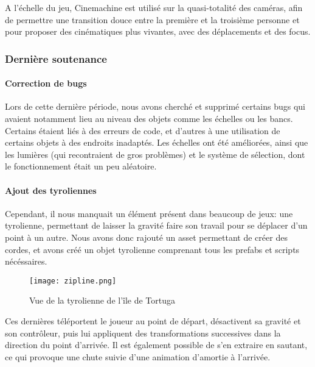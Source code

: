 			A l'échelle du jeu, Cinemachine est utilisé sur la quasi-totalité des caméras, 
			afin de permettre une transition douce entre la première et la troisième personne et pour 
			proposer des cinématiques plus vivantes, avec des déplacements et des focus.



	\subsubsection{Dernière soutenance}

		\paragraph{Correction de bugs}
			
			Lors de cette dernière période, nous avons cherché et supprimé certains bugs qui avaient notamment lieu au niveau des objets comme les échelles ou les bancs. 
			Certains étaient liés à des erreurs de code, et d'autres à une utilisation de certains objets à des endroits inadaptés.
			Les échelles ont été améliorées, ainsi que les lumières (qui recontraient de gros problèmes) et le système de 
			sélection, dont le fonctionnement était un peu aléatoire.

		\paragraph{Ajout des tyroliennes}

			Cependant, il nous manquait un élément présent dans beaucoup de jeux: une tyrolienne, permettant de laisser la 
			gravité faire son travail pour se déplacer d'un point à un autre. Nous avons donc rajouté un asset permettant 
			de créer des cordes, et avons créé un objet tyrolienne comprenant tous les prefabs et scripts nécéssaires.

			\begin{figure}[hbt!]
				\centering
				\texttt{[image: zipline.png]}
				\caption{Vue de la tyrolienne de l'île de Tortuga}
			\end{figure}
			\FloatBarrier

			Ces dernières téléportent le joueur au point de départ, désactivent 
			sa gravité et son contrôleur, puis lui appliquent des transformations 
			successives dans la direction du point d'arrivée. Il est également possible 
			de s'en extraire en sautant, ce qui provoque une chute suivie d'une animation 
			d'amortie à l'arrivée.


